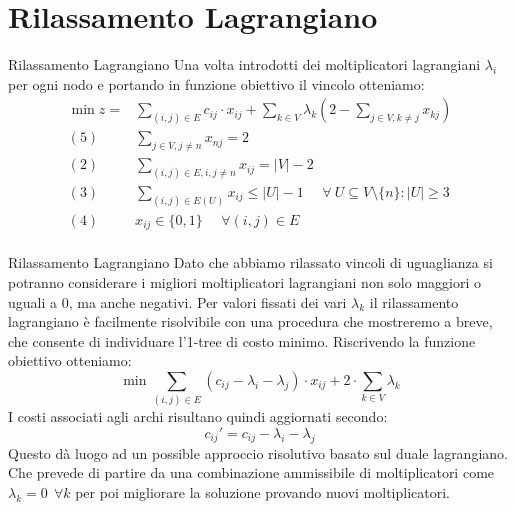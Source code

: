 \documentclass[10pt]{beamer}
\begin{document}
\section{Rilassamento Lagrangiano}
\begin{frame}{Rilassamento Lagrangiano}
    Una volta introdotti dei moltiplicatori lagrangiani $\lambda_i$ per ogni nodo e portando in funzione obiettivo il vincolo otteniamo:
    \begin{equation*}
        \begin{split}
             \min z = & \sum_{(i,j) \in E} c_{ij} \cdot x_{ij} + \sum_{k\in V} \lambda_k (2 - \sum_{j\in V, k\neq j} x_{kj})\\
            (5)\:\:\:\:\:\: & \sum_{j \in V, j \neq n} x_{nj} = 2 \\
            (2) \:\:\:\:\:\: & \sum_{(i,j)\in E, i, j \neq n} x_{ij} = |V|-2 \\
            (3) \:\:\:\:\:\: & \sum_{(i,j) \in E(U)} x_{ij} \leq |U| - 1 \:\:\:\:\:\: \forall\: U \subseteq V\setminus\{n\} : |U| \geq 3 \\
            (4) \:\:\:\:\:\: & x_{ij} \in \{0,1\} \:\:\:\:\:\: \forall (i,j) \in E\\
        \end{split}
    \end{equation*}
\end{frame}

\begin{frame}{Rilassamento Lagrangiano}
    Dato che abbiamo rilassato vincoli di uguaglianza si potranno considerare i migliori moltiplicatori lagrangiani non solo maggiori o uguali a 0, ma anche negativi. Per valori fissati dei vari $\lambda_k$ il rilassamento lagrangiano è facilmente risolvibile con una procedura che mostreremo a breve, che consente di individuare l'1-tree di costo minimo.
    \newline
    \newline
    Riscrivendo la funzione obiettivo otteniamo:
    \begin{equation*}
         \min \sum_{(i,j)\in E} ( c_{ij} - \lambda_i - \lambda_j) \cdot x_{ij} + 2 \cdot \sum_{k \in V} \lambda_k
    \end{equation*}
    I costi associati agli archi risultano quindi aggiornati secondo:
    \begin{equation*}
        c_{ij}' = c_{ij} - \lambda_i - \lambda_j
    \end{equation*}
    Questo dà luogo ad un possible approccio risolutivo basato sul duale lagrangiano. Che prevede di partire da una combinazione ammissibile di moltiplicatori come $\lambda_k = 0\:\: \forall k$ per poi migliorare la soluzione provando nuovi moltiplicatori.
\end{frame}
\end{document}

